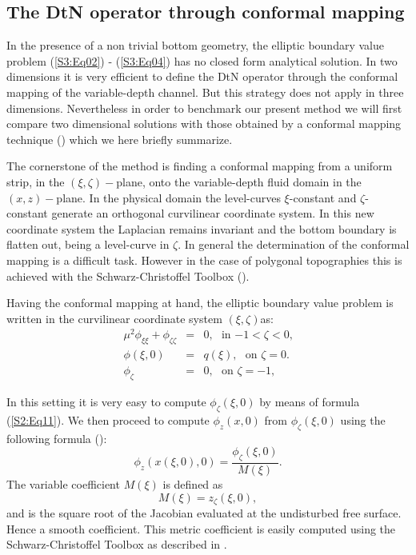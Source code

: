 
\subsection{The DtN operator through conformal mapping}

In the presence of a non trivial bottom geometry, the elliptic boundary value problem (\ref{S3:Eq02}) - (\ref{S3:Eq04}) has no closed form analytical solution. 
In two dimensions it is very efficient to define the DtN operator through the conformal mapping of the variable-depth channel.
But this strategy does not apply in three dimensions. 
Nevertheless in order to benchmark our present method we will first compare two dimensional solutions with those
obtained by a conformal mapping technique  (\citet{Nachbin2003}) which we here briefly summarize. 

The cornerstone of the method is finding a conformal mapping from a uniform strip, in the $(\xi,\zeta)-$plane, onto the 
variable-depth fluid domain in the $(x,z)-$plane. In the physical domain the level-curves 
 $\xi$-constant and $\zeta$-constant generate an orthogonal curvilinear coordinate system. In this new coordinate 
 system the Laplacian remains invariant and the bottom boundary is flatten out, being a level-curve in $\zeta$. 
 In general the determination of the conformal mapping is a difficult task. However in the case of polygonal topographies 
 this is achieved with the Schwarz-Christoffel Toolbox (\citet{Driscoll2002,FokasNachbin}).

Having the conformal mapping at hand, the elliptic boundary value problem is written 
in the curvilinear coordinate system $(\xi,\zeta)$as:
\begin{eqnarray}
\mu^2\phi_{\xi\xi} + \phi_{\zeta\zeta} &=& 0, \ \ \ \text{in $-1<\zeta<0$,}\label{S3:Eq24}\\
\phi(\xi,0) &=& q(\xi),\ \ \ \text{on $\zeta = 0$.}\label{S3:Eq26}\\
\phi_\zeta &=& 0, \ \ \ \text{on $\zeta = -1$,}\label{S3:Eq25}
\end{eqnarray}

In this setting it is very easy to compute $\phi_{\zeta}(\xi,0)$ by means of formula (\ref{S2:Eq11}). 
We then proceed to compute $\phi_z(x,0)$ from $\phi_{\zeta}(\xi,0)$ using the following formula (\cite{Nachbin2003}):
\begin{equation}\label{S3:Eq27}
\phi_z(x(\xi,0),0)  = \frac{\phi_{\zeta}(\xi,0)}{M(\xi)}.
\end{equation}
The variable coefficient $M(\xi)$ is defined as
\begin{equation}\label{S3:Eq28}
M(\xi)  = z_\zeta(\xi,0),
\end{equation}
and is the square root of the Jacobian evaluated at the undisturbed free surface. Hence a smooth coefficient.
This metric coefficient is easily computed using the Schwarz-Christoffel Toolbox  as described in \citet{FokasNachbin}.

